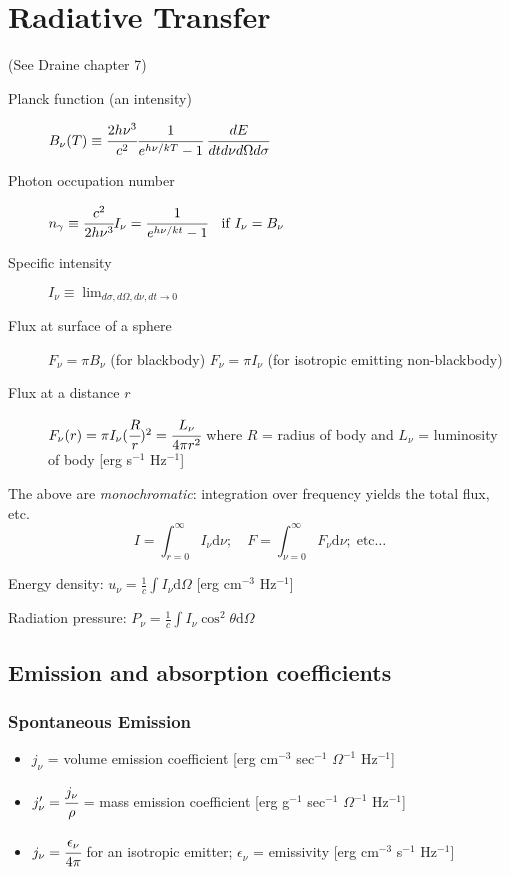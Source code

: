 \documentclass[11pt]{article}
\newcommand{\mar}[1]{\hspace{0pt}\marginpar{-\textcolor{black}{#1}-}}
\let\oldsection\section
\renewcommand\section{\clearpage\oldsection}
\begin{document}
\newpage
\section{Radiative Transfer}
\mar{24}(See Draine chapter 7)
\begin{description}%
    \item [Planck function (an intensity)]
        $ B_{\nu}(T) \equiv
        \cfrac{2h{\nu}^{3}}{c^{2}} \cfrac{1}{e^{h{\nu}/kT}-1} \;
        \cfrac{dE}{dt d\nu d\Omega d\sigma} $
    \item [Photon occupation number]
        $ n_{\gamma} \equiv \cfrac{c^{2}}{2h{\nu}^{3}} I_{\nu}
          = \cfrac{1}{e^{h{\nu}/kt} - 1} \quad \mathrm{if}\; I_{\nu} = B_{\nu} $
    \item [Specific intensity]
        $ I_{\nu} \equiv \lim_{d\sigma, d\Omega, d\nu, dt \to 0} $
    \item [Flux at surface of a sphere]
        $ F_{\nu} = \pi{B_{\nu}} $
        (for blackbody)\newline
        $ F_{\nu} = \pi{I_{\nu}} $
        (for isotropic emitting non-blackbody)
    \item [Flux at a distance $r$]
        $ F_{\nu}(r) = \pi{I_{\nu}}(\cfrac{R}{r})^{2}
        = \cfrac{L_{\nu}}{4\pi{r^{2}}}$ \newline
        where $R$ = radius of body and \newline
        $L_{\nu}$ = luminosity of body
        [erg s$^{-1}$ Hz$^{-1}$]
\end{description}


\mar{25}The above are \textit{monochromatic}: integration over frequency
yields the total flux, etc.
\[
    I = \int_{r=0}^{\infty} I_{\nu} \mathrm{d}\nu; \quad
    F = \int_{\nu=0}^{\infty} F_{\nu} \mathrm{d}\nu; \;\mathrm{etc\ldots}
    \]

Energy density:
$u_{\nu} = \frac{1}{c}\int{I_{\nu}\mathrm{d}\Omega}$ [erg cm$^{-3}$
Hz$^{-1}$]

Radiation pressure:
$P_{\nu} = \frac{1}{c}\int{I_{\nu}\cos^{2}\theta\mathrm{d}\Omega}$

\newpage
\subsection{Emission and absorption coefficients}
\subsubsection{Spontaneous Emission}
\begin{itemize}[label={}, itemsep=0ex]
    \item $j_{\nu}$ = volume emission coefficient
        [erg cm$^{-3}$ sec$^{-1}$ $\Omega^{-1}$ Hz$^{-1}$]
    \item $j'_{\nu} = \cfrac{j_{\nu}}{\rho}$ = mass emission coefficient
        [erg g$^{-1}$ sec$^{-1}$ $\Omega^{-1}$ Hz$^{-1}$]
    \item $j_{\nu} = \cfrac{\epsilon_{\nu}}{4\pi}$ for an isotropic
        emitter;
        $\epsilon_{\nu}$ = emissivity [erg cm$^{-3}$ s$^{-1}$ Hz$^{-1}$]
\end{itemize}
\end{document}
